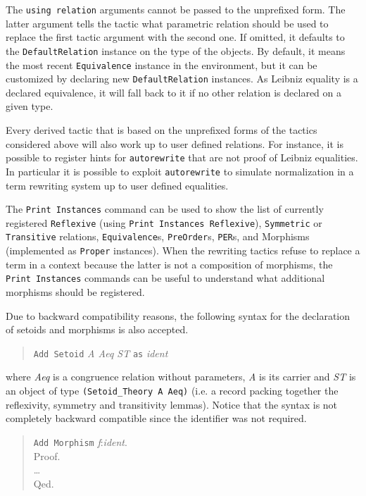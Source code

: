 The \texttt{using relation}
arguments cannot be passed to the unprefixed form. The latter argument
tells the tactic what parametric relation should be used to replace
the first tactic argument with the second one. If omitted, it defaults
to the \texttt{DefaultRelation} instance on the type of the objects.
By default, it means the most recent \texttt{Equivalence} instance in
the environment, but it can be customized by declaring new
\texttt{DefaultRelation} instances. As Leibniz equality is a declared
equivalence, it will fall back to it if no other relation is declared on
a given type.

Every derived tactic that is based on the unprefixed forms of the tactics
considered above will also work up to user defined relations. For instance,
it is possible to register hints for \texttt{autorewrite} that are
not proof of Leibniz equalities. In particular it is possible to exploit
\texttt{autorewrite} to simulate normalization in a term rewriting system
up to user defined equalities.

The \texttt{Print Instances} command can be used to show the list of
currently registered \texttt{Reflexive} (using \texttt{Print Instances Reflexive}),
\texttt{Symmetric} or \texttt{Transitive} relations,
\texttt{Equivalence}s, \texttt{PreOrder}s, \texttt{PER}s, and
Morphisms (implemented as \texttt{Proper} instances). When
 the rewriting tactics refuse to replace a term in a context
because the latter is not a composition of morphisms, the \texttt{Print Instances}
commands can be useful to understand what additional morphisms should be
registered.

Due to backward compatibility reasons, the following syntax for the
declaration of setoids and morphisms is also accepted.

\begin{quote}
  \texttt{Add Setoid} \textit{A Aeq ST} \texttt{as} \textit{ident}
\end{quote}
where \textit{Aeq} is a congruence relation without parameters,
\textit{A} is its carrier and \textit{ST} is an object of type
\texttt{(Setoid\_Theory A Aeq)} (i.e. a record packing together the reflexivity,
symmetry and transitivity lemmas). Notice that the syntax is not completely
backward compatible since the identifier was not required.

\begin{quote}
  \texttt{Add Morphism} \textit{f}:\textit{ident}.\\
  Proof.\\
  \ldots\\
  Qed.
\end{quote}

